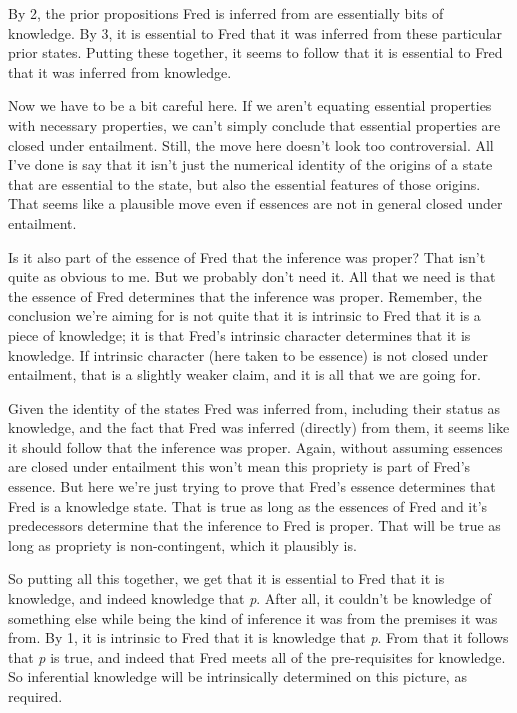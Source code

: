 \documentclass[
  11pt,
  letterpaper,
  DIV=11,
  numbers=noendperiod,
  twoside]{scrartcl}
\begin{document}
By 2, the prior propositions Fred is inferred from are essentially bits
of knowledge. By 3, it is essential to Fred that it was inferred from
these particular prior states. Putting these together, it seems to
follow that it is essential to Fred that it was inferred from knowledge.

Now we have to be a bit careful here. If we aren't equating essential
properties with necessary properties, we can't simply conclude that
essential properties are closed under entailment. Still, the move here
doesn't look too controversial. All I've done is say that it isn't just
the numerical identity of the origins of a state that are essential to
the state, but also the essential features of those origins. That seems
like a plausible move even if essences are not in general closed under
entailment.

Is it also part of the essence of Fred that the inference was proper?
That isn't quite as obvious to me. But we probably don't need it. All
that we need is that the essence of Fred determines that the inference
was proper. Remember, the conclusion we're aiming for is not quite that
it is intrinsic to Fred that it is a piece of knowledge; it is that
Fred's intrinsic character determines that it is knowledge. If intrinsic
character (here taken to be essence) is not closed under entailment,
that is a slightly weaker claim, and it is all that we are going for.

Given the identity of the states Fred was inferred from, including their
status as knowledge, and the fact that Fred was inferred (directly) from
them, it seems like it should follow that the inference was proper.
Again, without assuming essences are closed under entailment this won't
mean this propriety is part of Fred's essence. But here we're just
trying to prove that Fred's essence determines that Fred is a knowledge
state. That is true as long as the essences of Fred and it's
predecessors determine that the inference to Fred is proper. That will
be true as long as propriety is non-contingent, which it plausibly is.

So putting all this together, we get that it is essential to Fred that
it is knowledge, and indeed knowledge that \emph{p}. After all, it
couldn't be knowledge of something else while being the kind of
inference it was from the premises it was from. By 1, it is intrinsic to
Fred that it is knowledge that \emph{p}. From that it follows that
\emph{p} is true, and indeed that Fred meets all of the pre-requisites
for knowledge. So inferential knowledge will be intrinsically determined
on this picture, as required.
\end{document}

